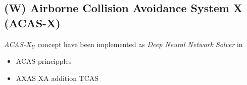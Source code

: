 \subsection{(W) Airborne Collision Avoidance System X  (ACAS-X)}\label{sec:ACASX}
\emph{ACAS-$X_U$} concept have been implemented as \emph{Deep Neural Network Solver} in \cite{katz2017reluplex}
\begin{itemize}
    \item ACAS principples
    \item AXAS XA addition TCAS
\end{itemize}

